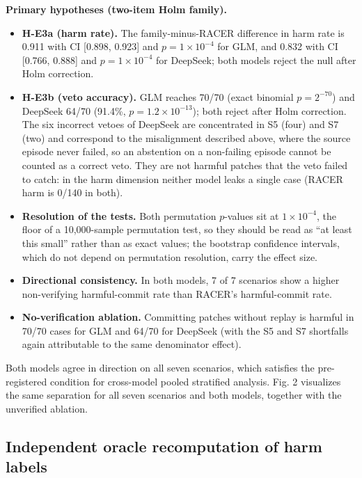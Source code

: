 \documentclass[10pt]{article}
\begin{document}
\textbf{Primary hypotheses (two-item Holm family).}

\begin{itemize}

  \item \textbf{H-E3a (harm rate).} The family-minus-RACER difference in harm rate is 0.911 with CI [0.898, 0.923] and $p = 1\times10^{-4}$ for GLM, and 0.832 with CI [0.766, 0.888] and $p = 1\times10^{-4}$ for DeepSeek; both models reject the null after Holm correction.

  \item \textbf{H-E3b (veto accuracy).} GLM reaches 70/70 (exact binomial $p = 2^{-70}$) and DeepSeek 64/70 (91.4\%, $p = 1.2\times10^{-13}$); both reject after Holm correction. The six incorrect vetoes of DeepSeek are concentrated in S5 (four) and S7 (two) and correspond to the misalignment described above, where the source episode never failed, so an abstention on a non-failing episode cannot be counted as a correct veto. They are not harmful patches that the veto failed to catch: in the harm dimension neither model leaks a single case (RACER harm is 0/140 in both).

  \item \textbf{Resolution of the tests.} Both permutation $p$-values sit at $1\times10^{-4}$, the floor of a 10,000-sample permutation test, so they should be read as ``at least this small'' rather than as exact values; the bootstrap confidence intervals, which do not depend on permutation resolution, carry the effect size.

  \item \textbf{Directional consistency.} In both models, 7 of 7 scenarios show a higher non-verifying harmful-commit rate than RACER's harmful-commit rate.

  \item \textbf{No-verification ablation.} Committing patches without replay is harmful in 70/70 cases for GLM and 64/70 for DeepSeek (with the S5 and S7 shortfalls again attributable to the same denominator effect).

\end{itemize}

Both models agree in direction on all seven scenarios, which satisfies the pre-registered condition for cross-model pooled stratified analysis. Fig. 2 visualizes the same separation for all seven scenarios and both models, together with the unverified ablation.

\subsection{Independent oracle recomputation of harm labels}
\end{document}
